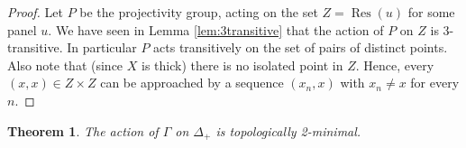 \documentclass[a4paper, 11pt]{article}
\theoremstyle{plain}
\newtheorem{theorem}[proposition]{Theorem}
\newtheorem{lemma}[proposition]{Lemma}
\theoremstyle{definition}
\theoremstyle{remark}
\DeclareMathOperator{\Res}{Res}
\newcommand{\op}{\mathrm{op}}
\begin{document}
\begin{proof}
Let $P$ be the projectivity group, acting on the set $Z=\Res(u)$ for some panel $u$.
We have seen in Lemma \ref{lem:3transitive} that the action of $P$ on $Z$ is $3$-transitive. In particular $P$ acts transitively on the set of pairs of distinct points. Also note that (since $X$ is thick) there is no isolated point in $Z$. Hence, every $(x,x)\in Z\times Z$ can be approached by a sequence $(x_n,x)$ with $x_n\neq x$ for every $n$.
\end{proof}

%

\begin{theorem}\label{thm:2minimal}
The action of $\Gamma$ on $\Delta_+$ is topologically 2-minimal.
\end{theorem}
\end{document}
